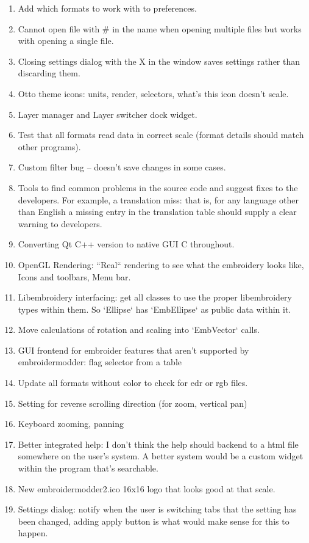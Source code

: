 \documentclass{report}
\begin{document}
\begin{enumerate}
\item Add which formats to work with to preferences.
\item Cannot open file with \# in the name when opening multiple files but works with opening a single file.
\item Closing settings dialog with the X in the window saves settings rather than discarding them.
\item Otto theme icons: units, render, selectors, what's this icon doesn't scale.
\item Layer manager and Layer switcher dock widget.
\item Test that all formats read data in correct scale (format details should match other programs).
\item Custom filter bug -- doesn't save changes in some cases.
\item Tools to find common problems in the source code and suggest fixes to the developers. For example, a translation miss: that is, for any language other than English a missing entry in the translation table should supply a clear warning to developers.
\item Converting Qt C++ version to native GUI C throughout.
\item OpenGL Rendering: ``Real`` rendering to see what the embroidery looks like, Icons and toolbars, Menu bar.
\item Libembroidery interfacing: get all classes to use the proper libembroidery types within them. So `Ellipse` has `EmbEllipse` as public data within it.
\item Move calculations of rotation and scaling into `EmbVector` calls.
\item GUI frontend for embroider features that aren't supported by embroidermodder: flag selector from a table
\item Update all formats without color to check for edr or rgb files.
\item Setting for reverse scrolling direction (for zoom, vertical pan)
\item Keyboard zooming, panning
\item Better integrated help: I don't think the help should backend to a html file somewhere on the user's system. A better system would be a custom widget within the program that's searchable.
\item New embroidermodder2.ico 16x16 logo that looks good at that scale.
\item Settings dialog: notify when the user is switching tabs that the setting has been changed, adding apply button is what would make sense for this to happen.
\end{enumerate}
\end{document}
